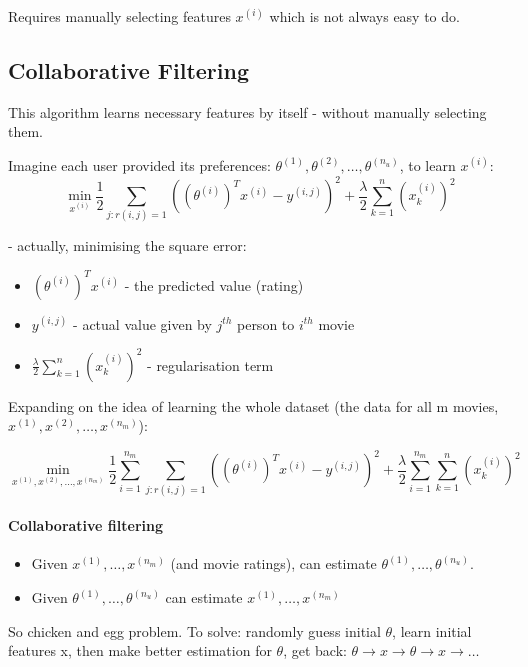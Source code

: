 \documentclass{scrartcl}
\begin{document}
Requires manually selecting features $x^{(i)}$ which is not always
easy to do. 

\subsection{Collaborative Filtering}
\label{sec:16-3}

This algorithm learns necessary features by itself - without manually
selecting them.

Imagine each user provided its preferences: $\theta^{(1)},
\theta^{(2)}, \dots, \theta^{(n_u)}$, to learn $x^{(i)}$: 
\[ \min \limits_{x^{(i)}} \frac{1}{2} \sum \limits_{j:r(i,
  j) = 1} ((\theta^{(i)})^T x^{(i)} - y^{(i,j)})^2 + \frac{\lambda}{2}
\sum \limits_{k=1}^n (x_k^{(i)})^2 \]

- actually, minimising the square error:
\begin{itemize}
\item $(\theta^{(i)})^T x^{(i)}$ - the predicted value (rating)
\item $y^{(i,j)}$ - actual value given by $j^{th}$ person to $i^{th}$
  movie
\item $\frac{\lambda}{2} \sum \limits_{k=1}^n (x_k^{(i)})^2$ -
  regularisation term
\end{itemize}

Expanding on the idea of learning the whole dataset (the data for all
m movies, $x^{(1)},x^{(2)}, \dots, x^{(n_m)}$):

\[ \min \limits_{x^{(1)},x^{(2)}, \dots, x^{(n_m)}} \frac{1}{2} \sum
\limits_{i=1}^{n_m} \sum \limits_{j:r(i, j) = 1} ((\theta^{(i)})^T
x^{(i)} - y^{(i,j)})^2 + \frac{\lambda}{2} \sum \limits_{i=1}^{n_m}
\sum \limits_{k=1}^n (x_k^{(i)})^2 \]

\paragraph{Collaborative filtering}
\begin{itemize}
\item Given  $x^{(1)}, \dots, x^{(n_m)}$ (and movie ratings), can
estimate $\theta^{(1)}, \dots, \theta^{(n_u)}$.
\item Given $\theta^{(1)}, \dots, \theta^{(n_u)}$ can estimate $x^{(1)}, \dots, x^{(n_m)}$
\end{itemize}

So chicken and egg problem. To solve: randomly guess initial $\theta$,
learn initial features x, then make better estimation for $\theta$,
get back: $\theta \to x \to \theta \to x \to \dots$
\end{document}
